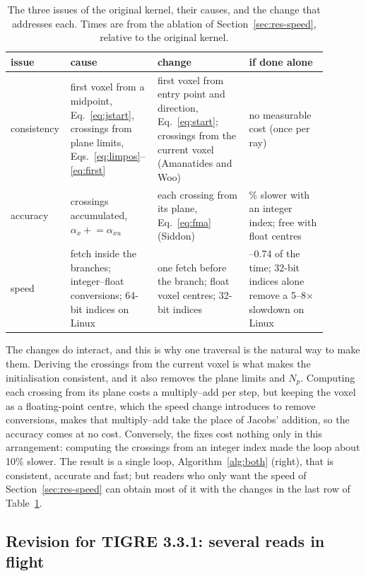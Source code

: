 \documentclass[11pt,a4paper]{article}
\theoremstyle{remark}
\begin{document}
\begin{table}[h]
\centering
\caption{\label{tab:coupling}The three issues of the original kernel, their causes, and the change that
addresses each. Times are from the ablation of Section~\ref{sec:res-speed}, relative to the original kernel.}
\small
\begin{tabular}{>{\raggedright\arraybackslash}p{0.12\linewidth}>{\raggedright\arraybackslash}p{0.25\linewidth}>{\raggedright\arraybackslash}p{0.28\linewidth}>{\raggedright\arraybackslash}p{0.24\linewidth}}
\toprule
issue & cause & change & if done alone\\
\midrule
consistency & first voxel from a midpoint, Eq.~\eqref{eq:jstart}, crossings from plane limits,
Eqs.~\eqref{eq:limpos}--\eqref{eq:first} & first voxel from entry point and direction, Eq.~\eqref{eq:start};
crossings from the current voxel (Amanatides and Woo) & no measurable cost (once per ray)\\
accuracy & crossings accumulated, $\alpha_x\mathrel{+}=\alpha_{xu}$ & each crossing from its plane,
Eq.~\eqref{eq:fma} (Siddon) & 10\% slower with an integer index; free with float centres\\
speed & fetch inside the branches; integer--float conversions; 64-bit indices on Linux & one fetch before
the branch; float voxel centres; 32-bit indices & 0.55--0.74 of the time; 32-bit indices alone remove
a 5--8$\times$ slowdown on Linux\\
\bottomrule
\end{tabular}
\end{table}

The changes do interact, and this is why one traversal is the natural way to make them. Deriving the
crossings from the current voxel is what makes the initialisation consistent, and it also removes the plane
limits and $N_p$. Computing each crossing from its plane costs a multiply--add per step, but keeping the voxel
as a floating-point centre, which the speed change introduces to remove conversions, makes that multiply--add
take the place of Jacobs' addition, so the accuracy comes at no cost. Conversely, the fixes cost nothing only
in this arrangement: computing the crossings from an integer index made the loop about 10\% slower. The
result is a single loop, Algorithm~\ref{alg:both} (right), that is consistent, accurate and fast; but readers
who only want the speed of Section~\ref{sec:res-speed} can obtain most of it with the changes in the last
row of Table~\ref{tab:coupling}.

\subsection{Revision for TIGRE 3.3.1: several reads in flight}
\label{sec:v331}
\end{document}
